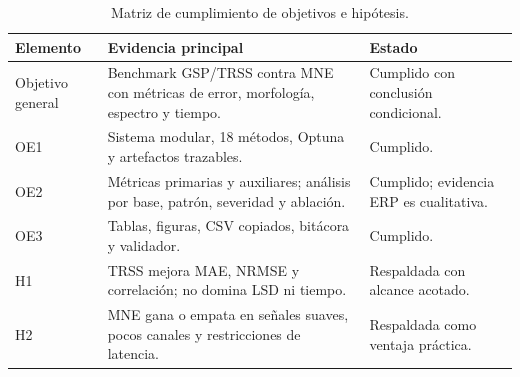 \begin{table}[htbp]
\centering
\small
\caption{Matriz de cumplimiento de objetivos e hipótesis.}
\label{tab:ch8_objective_evidence}
\begin{tabular}{@{}p{2.4cm}p{5.4cm}p{3.7cm}@{}}
\toprule
Elemento & Evidencia principal & Estado \\
\midrule
Objetivo general & Benchmark GSP/TRSS contra MNE con métricas de error, morfología, espectro y tiempo. & Cumplido con conclusión condicional. \\
OE1 & Sistema modular, 18 métodos, Optuna y artefactos trazables. & Cumplido. \\
OE2 & Métricas primarias y auxiliares; análisis por base, patrón, severidad y ablación. & Cumplido; evidencia ERP es cualitativa. \\
OE3 & Tablas, figuras, CSV copiados, bitácora y validador. & Cumplido. \\
H1 & TRSS mejora MAE, NRMSE y correlación; no domina LSD ni tiempo. & Respaldada con alcance acotado. \\
H2 & MNE gana o empata en señales suaves, pocos canales y restricciones de latencia. & Respaldada como ventaja práctica. \\
\bottomrule
\end{tabular}
\end{table}
